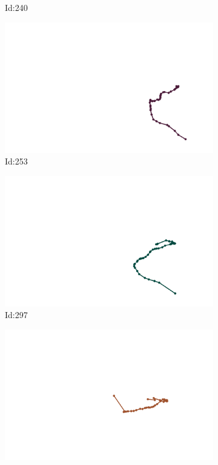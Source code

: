 \documentclass[12pt,twoside]{report}
\begin{document}
\begin{figure}
\begin{subfigure}[b]{0.20\textwidth}
\caption{Id:240}
\end{subfigure}
\begin{subfigure}[b]{0.20\textwidth}
\centering
\includegraphics[width=\textwidth]{../trajectories/253.png}
\caption{Id:253}
\end{subfigure}
\begin{subfigure}[b]{0.20\textwidth}
\centering
\includegraphics[width=\textwidth]{../trajectories/297.png}
\caption{Id:297}
\end{subfigure}
\begin{subfigure}[b]{0.20\textwidth}
\centering
\includegraphics[width=\textwidth]{../trajectories/345.png}

\end{subfigure}
\end{figure}
\end{document}
